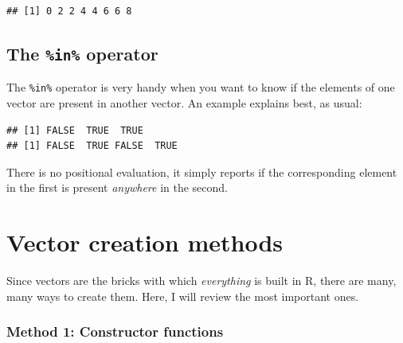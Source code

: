 \documentclass[]{book}
\newenvironment{Shaded}{\begin{snugshade}}{\end{snugshade}}
\newcommand{\KeywordTok}[1]{\textcolor[rgb]{0.13,0.29,0.53}{\textbf{#1}}}
\newcommand{\NormalTok}[1]{#1}
\newcommand{\OperatorTok}[1]{\textcolor[rgb]{0.81,0.36,0.00}{\textbf{#1}}}
\newcommand{\StringTok}[1]{\textcolor[rgb]{0.31,0.60,0.02}{#1}}
\begin{document}
\begin{verbatim}
## [1] 0 2 2 4 4 6 6 8
\end{verbatim}

\hypertarget{the-in-operator}{%
\subsection{\texorpdfstring{The \texttt{\%in\%} operator}{The \%in\% operator}}\label{the-in-operator}}

The \texttt{\%in\%} operator is very handy when you want to know if the elements of one vector are present in another vector. An example explains best, as usual:

\begin{Shaded}
\end{Shaded}

\begin{verbatim}
## [1] FALSE  TRUE  TRUE
## [1] FALSE  TRUE FALSE  TRUE
\end{verbatim}

There is no positional evaluation, it simply reports if the corresponding element in the first is present \emph{anywhere} in the second.

\hypertarget{vector-creation-methods}{%
\section{Vector creation methods}\label{vector-creation-methods}}

Since vectors are the bricks with which \emph{everything} is built in R, there are many, many ways to create them. Here, I will review the most important ones.

\hypertarget{method-1-constructor-functions}{%
\subsubsection*{Method 1: Constructor functions}\label{method-1-constructor-functions}}
\end{document}
